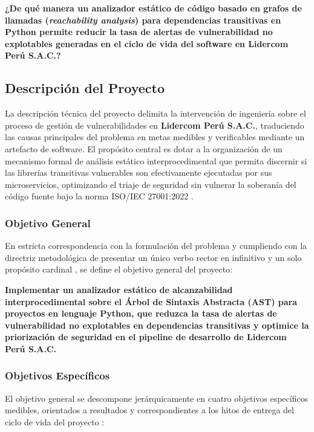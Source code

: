 \vspace{0.3cm}
\noindent
\textbf{¿De qué manera un analizador estático de código basado en grafos de llamadas (\textit{reachability analysis}) para dependencias transitivas en Python permite reducir la tasa de alertas de vulnerabilidad no explotables generadas en el ciclo de vida del software en Lidercom Perú S.A.C.?}

\subsection{Descripción del Proyecto}
La descripción técnica del proyecto delimita la intervención de ingeniería sobre el proceso de gestión de vulnerabilidades en \textbf{Lidercom Perú S.A.C.}, traduciendo las causas principales del problema en metas medibles y verificables mediante un artefacto de software.
El propósito central es dotar a la organización de un mecanismo formal de análisis estático interprocedimental que permita discernir si las librerías transitivas vulnerables son efectivamente ejecutadas por sus microservicios, optimizando el triaje de seguridad sin vulnerar la soberanía del código fuente bajo la norma ISO/IEC 27001:2022 \parencite{ladisa2023sok, gutierrez2024auditoria}. %

\subsubsection{Objetivo General}
En estricta correspondencia con la formulación del problema y cumpliendo con la directriz metodológica de presentar un único verbo rector en infinitivo y un solo propósito cardinal \parencite{torres2026proyecto}, se define el objetivo general del proyecto: %

\vspace{0.2cm}
\noindent
\textbf{Implementar un analizador estático de alcanzabilidad interprocedimental sobre el Árbol de Sintaxis Abstracta (AST) para proyectos en lenguaje Python, que reduzca la tasa de alertas de vulnerabilidad no explotables en dependencias transitivas y optimice la priorización de seguridad en el pipeline de desarrollo de Lidercom Perú S.A.C.} %

\subsubsection{Objetivos Específicos}
El objetivo general se descompone jerárquicamente en cuatro objetivos específicos medibles, orientados a resultados y correspondientes a los hitos de entrega del ciclo de vida del proyecto \parencite{torres2026proyecto, pmi2021pmbok}: %

